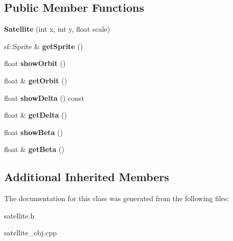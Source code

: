 \subsection*{Public Member Functions}
\begin{DoxyCompactItemize}
\item 
\mbox{\label{class_satellite_ae820a6cb0d5fb82912815ce2d12d6ead}} 
{\bfseries Satellite} (int x, int y, float scale)
\item 
\mbox{\label{class_satellite_a8f3373cb1e63bc86ad9a93a838787b99}} 
sf\+::\+Sprite \& {\bfseries get\+Sprite} ()
\item 
\mbox{\label{class_satellite_a9672dcdd8e0a455e8a6225a161d2af2d}} 
float {\bfseries show\+Orbit} ()
\item 
\mbox{\label{class_satellite_a8fd3c6d15b153bf2186fd9df46eb1572}} 
float \& {\bfseries get\+Orbit} ()
\item 
\mbox{\label{class_satellite_adadcdf9164cf336687b1af7afce19a92}} 
float {\bfseries show\+Delta} () const
\item 
\mbox{\label{class_satellite_a173a28416bfdb020084ff4502d5bb983}} 
float \& {\bfseries get\+Delta} ()
\item 
\mbox{\label{class_satellite_ad19d99087f6683d1bf5df900dafa3e38}} 
float {\bfseries show\+Beta} ()
\item 
\mbox{\label{class_satellite_add23f290f62fa2af6d650b13d6919708}} 
float \& {\bfseries get\+Beta} ()
\end{DoxyCompactItemize}
\subsection*{Additional Inherited Members}


The documentation for this class was generated from the following files\+:\begin{DoxyCompactItemize}
\item 
satellite.\+h\item 
satellite\+\_\+obj.\+cpp\end{DoxyCompactItemize}
